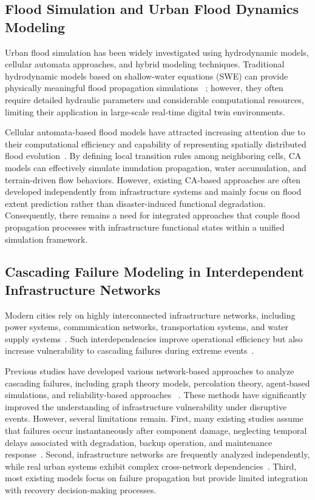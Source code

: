 \documentclass[preprint,12pt]{elsarticle}
\begin{document}
\subsection{Flood Simulation and Urban Flood Dynamics Modeling}
Urban flood simulation has been widely investigated using hydrodynamic
models, cellular automata approaches, and hybrid modeling techniques.
Traditional hydrodynamic models based on shallow-water equations (SWE) can
provide physically meaningful flood propagation simulations
~\cite{bates2010simple}; however, they often require detailed hydraulic
parameters and considerable computational resources, limiting their
application in large-scale real-time digital twin environments.

Cellular automata-based flood models have attracted increasing attention due
to their computational efficiency and capability of representing spatially
distributed flood evolution~\cite{ghimire2013formulation,
guidolin2016weighted,issermann2020efficient}. By defining local transition
rules among neighboring cells, CA models can effectively simulate inundation
propagation, water accumulation, and terrain-driven flow behaviors. However,
existing CA-based approaches are often developed independently from
infrastructure systems and mainly focus on flood extent prediction rather
than disaster-induced functional degradation. Consequently, there remains a
need for integrated approaches that couple flood propagation processes with
infrastructure functional states within a unified simulation framework.

\subsection{Cascading Failure Modeling in Interdependent Infrastructure Networks}
Modern cities rely on highly interconnected infrastructure networks,
including power systems, communication networks, transportation systems, and
water supply systems~\cite{rinaldi2001identifying}. Such interdependencies
improve operational efficiency but also increase vulnerability to cascading
failures during extreme events~\cite{buldyrev2010catastrophic,gao2011robustness}.

Previous studies have developed various network-based approaches to analyze
cascading failures, including graph theory models, percolation theory,
agent-based simulations, and reliability-based approaches
~\cite{ouyang2014review}. These methods have significantly improved the
understanding of infrastructure vulnerability under disruptive events.
However, several limitations remain. First, many existing studies assume that
failures occur instantaneously after component damage, neglecting temporal
delays associated with degradation, backup operation, and maintenance
response~\cite{ouyang2012time}. Second, infrastructure networks are
frequently analyzed independently, while real urban systems exhibit complex
cross-network dependencies~\cite{ouyang2012three}. Third, most existing
models focus on failure propagation but provide limited integration with
recovery decision-making processes.
\end{document}
